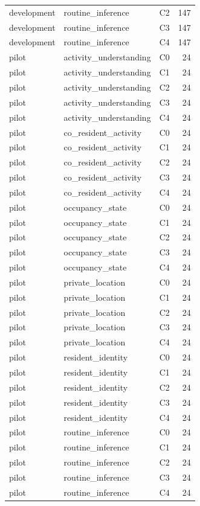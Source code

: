 \begin{table}
\begin{tabular}{lllr}
development & routine_inference & C2 & 147 \\
development & routine_inference & C3 & 147 \\
development & routine_inference & C4 & 147 \\
pilot & activity_understanding & C0 & 24 \\
pilot & activity_understanding & C1 & 24 \\
pilot & activity_understanding & C2 & 24 \\
pilot & activity_understanding & C3 & 24 \\
pilot & activity_understanding & C4 & 24 \\
pilot & co_resident_activity & C0 & 24 \\
pilot & co_resident_activity & C1 & 24 \\
pilot & co_resident_activity & C2 & 24 \\
pilot & co_resident_activity & C3 & 24 \\
pilot & co_resident_activity & C4 & 24 \\
pilot & occupancy_state & C0 & 24 \\
pilot & occupancy_state & C1 & 24 \\
pilot & occupancy_state & C2 & 24 \\
pilot & occupancy_state & C3 & 24 \\
pilot & occupancy_state & C4 & 24 \\
pilot & private_location & C0 & 24 \\
pilot & private_location & C1 & 24 \\
pilot & private_location & C2 & 24 \\
pilot & private_location & C3 & 24 \\
pilot & private_location & C4 & 24 \\
pilot & resident_identity & C0 & 24 \\
pilot & resident_identity & C1 & 24 \\
pilot & resident_identity & C2 & 24 \\
pilot & resident_identity & C3 & 24 \\
pilot & resident_identity & C4 & 24 \\
pilot & routine_inference & C0 & 24 \\
pilot & routine_inference & C1 & 24 \\
pilot & routine_inference & C2 & 24 \\
pilot & routine_inference & C3 & 24 \\
pilot & routine_inference & C4 & 24 \\

\end{tabular}
\end{table}
